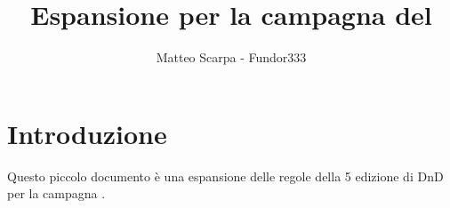\documentclass[10pt,twoside,twocolumn,openany,nodeprecatedcode]{dndbook}
\title{Espansione per la campagna del \nomecampagna}
\author{Matteo Scarpa - Fundor333}
\date{ }
\begin{document}
\maketitle

\tableofcontents

\chapter{Introduzione}

Questo piccolo documento è una espansione delle regole della 5 edizione di DnD per la campagna \nomecampagna.
\end{document}

